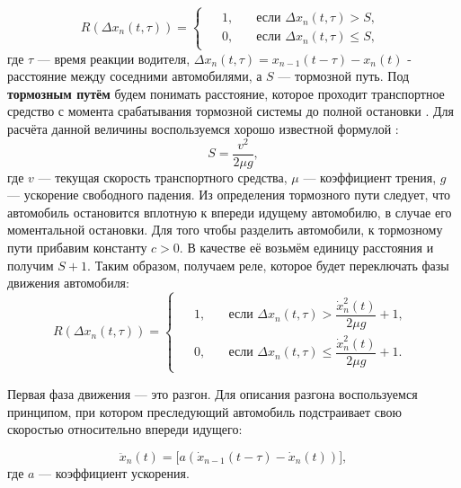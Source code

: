 \documentclass[12pt, a4paper]{extarticle}
\numberwithin{equation}{section}
\numberwithin{figure}{section}
\begin{document}
\begin{equation*}
R(\Delta x_{n}(t,\tau))=
\begin{cases}
\begin{split}
&1,\quad &\text{если }\Delta x_{n}(t,\tau) >S, \\
&0,\quad &\text{если }\Delta x_{n}(t,\tau) \leq S,
\end{split}
\end{cases}
\end{equation*}
где $\tau$ --- время реакции водителя, $\Delta x_{n}(t,\tau)=x_{n-1}(t-\tau)-x_n(t)$ - расстояние между соседними автомобилями, а $S$ --- тормозной путь. Под \textbf{тормозным путём} будем понимать расстояние, которое проходит транспортное средство с момента срабатывания тормозной системы до полной остановки \cite{PDD}. Для расчёта данной величины воспользуемся хорошо известной формулой \cite{Physics}:
\begin{equation*} 
S=\dfrac{v^2}{2\mu g},
\end{equation*}
где $v$ --- текущая скорость транспортного средства, $\mu$ --- коэффициент трения, $g$ --- ускорение свободного падения. Из определения тормозного пути следует, что автомобиль остановится вплотную к впереди идущему автомобилю, в случае его моментальной остановки. Для того чтобы разделить автомобили, к тормозному пути прибавим константу $c > 0$. В качестве её возьмём единицу расстояния и получим $S+1$. Таким образом, получаем реле, которое будет переключать фазы движения автомобиля:
\begin{equation}\label{rele}
R(\Delta x_{n}(t,\tau))=
\begin{cases}
\begin{split}
&1,\quad &\text{если }\Delta x_{n}(t,\tau) > \dfrac{\dot{x}_n^2(t)}{2\mu g}+1, \\
&0,\quad &\text{если }\Delta x_{n}(t,\tau) \leq \dfrac{\dot{x}_n^2(t)}{2\mu g}+1.
\end{split}
\end{cases}
\end{equation}

Первая фаза движения --- это разгон. Для описания разгона воспользуемся принципом, при котором преследующий автомобиль подстраивает свою скоростью относительно впереди идущего:

\begin{equation*}
\ddot{x}_n(t)= \bigg[ a(\dot{x}_{n-1}(t-\tau)-\dot{x}_n(t))\bigg],
\end{equation*}
где $a$ --- коэффициент ускорения.
\end{document}
